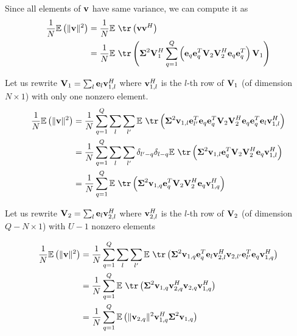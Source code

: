 Since all elements of $\boldsymbol{\mathrm{v}}$ have same variance, we can compute it as
\begin{subequations}
\begin{align}
\frac{1}{N}\mathbb{E}\left(\|\vect{v}\|^2\right)&=\frac{1}{N}\mathbb{E}\ \tr\left(\vect{v}\vect{v}^H\right)\\
&=\frac{1}{N}\mathbb{E} \ \tr\left( \mat{\Sigma}^2\mat{V}_1^H  \sum_{q=1}^Q\left(\vect{e}_q \vect{e}_q^T \mat{V}_2 \mat{V}_2^H \vect{e}_{q} \vect{e}_{q}^T\right)\mat{V}_1 \right)
\end{align}
\end{subequations}

Let us rewrite $\boldsymbol{\mathrm{V}}_1=\sum_{l}\boldsymbol{\mathrm{e}}_{l}\boldsymbol{\mathrm{v}}_{1,l}^H$ where $\boldsymbol{\mathrm{v}}_{1,l}^H$ is the $l$-th row of $\boldsymbol{\mathrm{V}}_1$ (of dimension $N\times 1$) with only one nonzero element.
\begin{subequations}
\begin{align}
\frac{1}{N}\mathbb{E}\left(\|\vect{v}\|^2\right)&=\frac{1}{N}\sum_{q=1}^Q\sum_{l}\sum_{l'}\mathbb{E} \ \tr\left( \mat{\Sigma}^2\vect{v}_{1,l}\vect{e}_{l'}^T  \vect{e}_q \vect{e}_q^T \mat{V}_2 \mat{V}_2^H \vect{e}_{q} \vect{e}_{q}^T\vect{e}_{l}\vect{v}_{1,l}^H \right)\\
&=\frac{1}{N}\sum_{q=1}^Q\sum_{l}\sum_{l'}\delta_{l'-q}\delta_{l-q} \mathbb{E} \ \tr\left( \mat{\Sigma}^2\vect{v}_{1,l}\vect{e}_q^T \mat{V}_2 \mat{V}_2^H \vect{e}_{q} \vect{v}_{1,l}^H \right)\\
&=\frac{1}{N}\sum_{q=1}^Q \mathbb{E} \ \tr\left( \mat{\Sigma}^2\vect{v}_{1,q}\vect{e}_q^T \mat{V}_2 \mat{V}_2^H \vect{e}_{q} \vect{v}_{1,q}^H \right)
\end{align}
\end{subequations}

Let us rewrite $\boldsymbol{\mathrm{V}}_2=\sum_{l}\boldsymbol{\mathrm{e}}_{l}\boldsymbol{\mathrm{v}}_{2,l}^H$ where $\boldsymbol{\mathrm{v}}_{2,l}^H$ is the $l$-th row of $\boldsymbol{\mathrm{V}}_2$ (of dimension $Q-N\times 1$) with $U-1$ nonzero elements

\begin{subequations}
\begin{align}
\frac{1}{N}\mathbb{E}\left(\|\vect{v}\|^2\right)&=\frac{1}{N}\sum_{q=1}^Q\sum_l\sum_{l'} \mathbb{E} \ \tr\left( \mat{\Sigma}^2\vect{v}_{1,q}\vect{e}_q^T \vect{e}_{l}\vect{v}_{2,l}^H \vect{v}_{2,l'} \vect{e}_{l'}^T \vect{e}_{q} \vect{v}_{1,q}^H \right)\\
&=\frac{1}{N}\sum_{q=1}^Q \mathbb{E} \ \tr\left( \mat{\Sigma}^2\vect{v}_{1,q}\vect{v}_{2,q}^H \vect{v}_{2,q} \vect{v}_{1,q}^H \right)\\
&=\frac{1}{N}\sum_{q=1}^Q \mathbb{E} \left( \| \vect{v}_{2,q}\|^2\vect{v}_{1,q}^H\mat{\Sigma}^2\vect{v}_{1,q}  \right)
\end{align}
\end{subequations}

